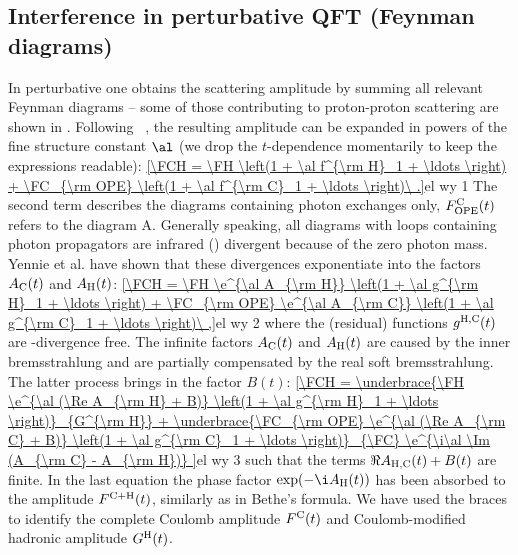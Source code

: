 \subsection[int qft]{Interference in perturbative QFT (Feynman diagrams)}



In perturbative  one obtains the scattering amplitude by summing all relevant Feynman diagrams -- some of those contributing to proton-proton scattering are shown in . Following \WaY\ , the resulting amplitude can be expanded in powers of the fine structure constant $\al$ (we drop the $t$-dependence momentarily to keep the expressions readable):
\eqref{\FCH = \FH \left(1 + \al f^{\rm H}_1 + \ldots \right) + \FC_{\rm OPE} \left(1 + \al f^{\rm C}_1 + \ldots \right)\ .}{el wy 1}
The second term describes the diagrams containing photon exchanges only, $F^{\rm C}_{\rm OPE}(t)$ refers to the diagram  A. Generally speaking, all diagrams with loops containing photon propagators are infrared () divergent because of the zero photon mass. Yennie et al.  have shown that these divergences exponentiate into the factors $A_{\rm C}(t)$ and $A_{\rm H}(t)$:
\eqref{\FCH = \FH \e^{\al A_{\rm H}} \left(1 + \al g^{\rm H}_1 + \ldots \right) + \FC_{\rm OPE} \e^{\al A_{\rm C}} \left(1 + \al g^{\rm C}_1 + \ldots \right)\ ,}{el wy 2}
where the (residual) functions $g^{\rm H, C}(t)$ are -divergence free. The infinite factors $A_{\rm C}(t)$ and $A_{\rm H}(t)$ are caused by the inner bremsstrahlung and are partially compensated by the real soft bremsstrahlung. The latter process brings in the factor $B(t)$:
\eqref{\FCH =
\underbrace{\FH \e^{\al (\Re A_{\rm H} + B)} \left(1 + \al g^{\rm H}_1 + \ldots \right)}_{G^{\rm H}}
+
\underbrace{\FC_{\rm OPE} \e^{\al (\Re A_{\rm C} + B)} \left(1 + \al g^{\rm C}_1 + \ldots \right)}_{\FC}
\e^{\i\al \Im (A_{\rm C} - A_{\rm H})}
}{el wy 3}
such that the terms $\Re A_{\rm H, C}(t) + B(t)$ are finite. In the last equation the phase factor $\exp(-\i A_{\rm H}(t))$ has been absorbed to the amplitude $F^{\rm C+H}(t)$, similarly as in Bethe's formula. We have used the braces to identify the complete Coulomb amplitude $F^{\rm C}(t)$ and Coulomb-modified hadronic amplitude $G^{\rm H}(t)$.

